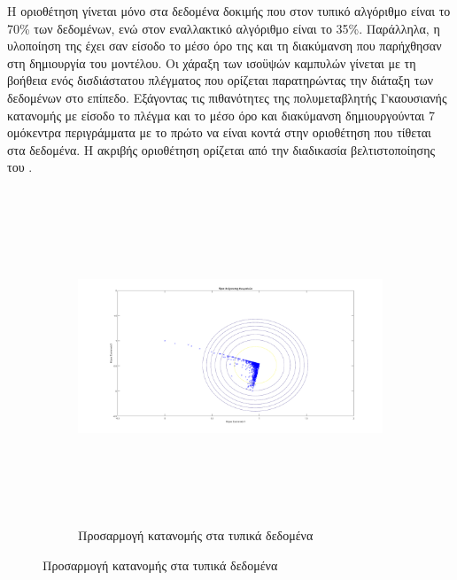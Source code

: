 Η οριοθέτηση γίνεται μόνο στα δεδομένα δοκιμής που στον τυπικό αλγόριθμο είναι το 70\% των δεδομένων, ενώ στον εναλλακτικό αλγόριθμο είναι το 35\%. Παράλληλα, η υλοποίηση της έχει σαν είσοδο το μέσο όρο της και τη διακύμανση που παρήχθησαν στη δημιουργία του μοντέλου. Οι χάραξη των ισοϋψών καμπυλών γίνεται με τη βοήθεια ενός δισδιάστατου πλέγματος που ορίζεται παρατηρώντας την διάταξη των δεδομένων στο επίπεδο. Εξάγοντας τις πιθανότητες της πολυμεταβλητής Γκαουσιανής κατανομής με είσοδο το πλέγμα και το μέσο όρο και διακύμανση δημιουργούνται 7 ομόκεντρα περιγράμματα με το πρώτο να είναι κοντά στην οριοθέτηση που τίθεται στα δεδομένα. Η ακριβής οριοθέτηση ορίζεται από την διαδικασία βελτιστοποίησης του .\par
\newpage
\begin{figure}[ht!]
\begin{subfigure}[b]{0.4\textwidth}
\includegraphics[width=160mm, height=100mm]{../../plots/gr_threshold_semi_sup_1.png}
\caption{Προσαρμογή κατανομής στα τυπικά δεδομένα}
\label{fig:threshanomalydetection1}
\end{subfigure}


\end{figure}
